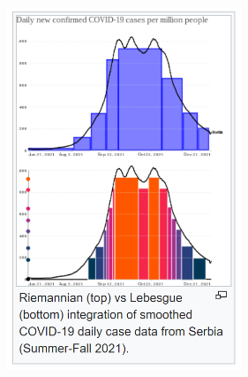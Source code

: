 \begin{figure}[h]
    \centering
    \includegraphics[width=7cm]{img/leb2.png}
    \caption{}
    \label{fig:leb2}
\end{figure}

